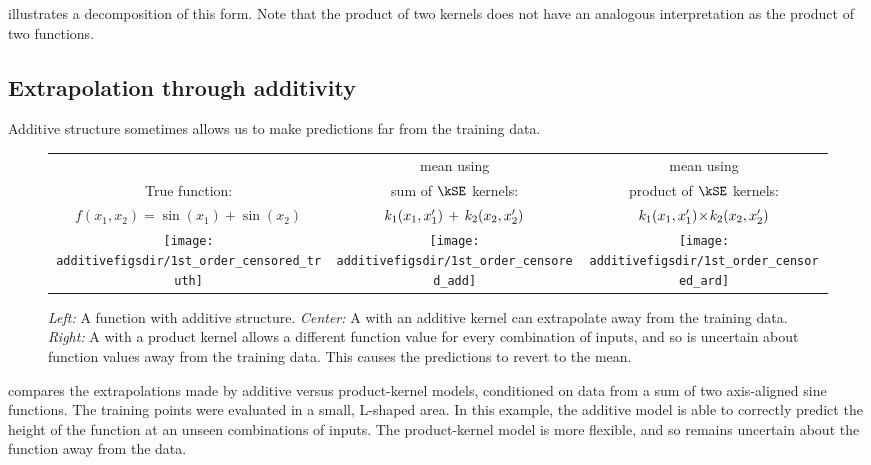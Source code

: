  illustrates a decomposition of this form.
Note that the product of two kernels does not have an analogous interpretation as the product of two functions.


\subsection{Extrapolation through additivity}
\label{sec:additivity-extrapolation}

Additive structure sometimes allows us to make predictions far from the training data.
%
\begin{figure}
\centering
\begin{tabular}{ccc}
 & \gp{} mean using & \gp{} mean using \\
True function: & sum of $\kSE$ kernels: & product of $\kSE$ kernels: \\
\parbox{0.33\columnwidth}{$f(x_1, x_2) = \sin(x_1) + \sin(x_2)$} & $k_1(x_1, x_1') \, + \, k_2(x_2, x_2')$ &  $k_1(x_1, x_1') \! \times \! k_2(x_2, x_2')$ \\[0.2em]
\hspace{-0.1in}\texttt{[image: \\additivefigsdir/1st\_order\_censored\_truth]} &
\hspace{-0.1in}\texttt{[image: \\additivefigsdir/1st\_order\_censored\_add]} & 
\hspace{-0.1in}\texttt{[image: \\additivefigsdir/1st\_order\_censored\_ard]}\\[0em]
\end{tabular}
\caption[Extrapolation in functions with additive structure]
{\emph{Left:} A function with additive structure.
\emph{Center:} A \gp{} with an additive kernel can extrapolate away from the training data.
\emph{Right:} A \gp{} with a product kernel allows a different function value for every combination of inputs, and so is uncertain about function values away from the training data.  This causes the predictions to revert to the mean.
}
\label{fig:synth2d}
\end{figure}
%
 compares the extrapolations made by additive versus product-kernel \gp{} models, conditioned on data from a sum of two axis-aligned sine functions.
The training points were evaluated in a small, L-shaped area.
In this example, the additive model is able to correctly predict the height of the function at an unseen combinations of inputs.
The product-kernel model is more flexible, and so remains uncertain about the function away from the data.

